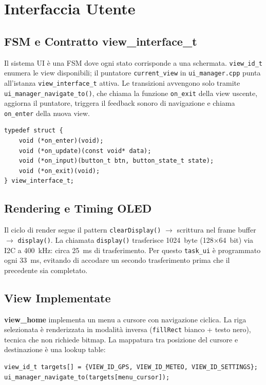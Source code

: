 \newpage

\section{Interfaccia Utente}


\subsection{FSM e Contratto view\_interface\_t}

Il sistema UI è una FSM dove ogni stato corrisponde a una schermata.
\texttt{view\_id\_t} enumera le view disponibili; il puntatore
\texttt{current\_view} in \texttt{ui\_manager.cpp} punta all'istanza
\texttt{view\_interface\_t} attiva. Le transizioni avvengono solo tramite
\texttt{ui\_manager\_navigate\_to()}, che chiama la funzione \texttt{on\_exit} della
view uscente, aggiorna il puntatore, triggera il feedback sonoro di navigazione
e chiama \texttt{on\_enter} della nuova view.

\begin{lstlisting}[caption={view\_definitions.h --- contratto funzionale di una view}]
typedef struct {
    void (*on_enter)(void);
    void (*on_update)(const void* data);
    void (*on_input)(button_t btn, button_state_t state);
    void (*on_exit)(void);
} view_interface_t;
\end{lstlisting}


\subsection{Rendering e Timing OLED}

Il ciclo di render segue il pattern \texttt{clearDisplay()} $\to$ scrittura
nel frame buffer $\to$ \texttt{display()}. La chiamata \texttt{display()}
trasferisce 1024~byte (128$\times$64~bit) via I2C a 400~kHz: circa 25~ms di
trasferimento. Per questo \texttt{task\_ui} è programmato ogni 33~ms,
evitando di accodare un secondo trasferimento prima che il precedente sia
completato.

\subsection{View Implementate}

\textbf{view\_home} implementa un menu a cursore con navigazione ciclica.
La riga selezionata è renderizzata in modalità inversa
(\texttt{fillRect} bianco + testo nero), tecnica che non richiede bitmap.
La mappatura tra posizione del cursore e destinazione è una lookup table:
\begin{lstlisting}
view_id_t targets[] = {VIEW_ID_GPS, VIEW_ID_METEO, VIEW_ID_SETTINGS};
ui_manager_navigate_to(targets[menu_cursor]);
\end{lstlisting}

